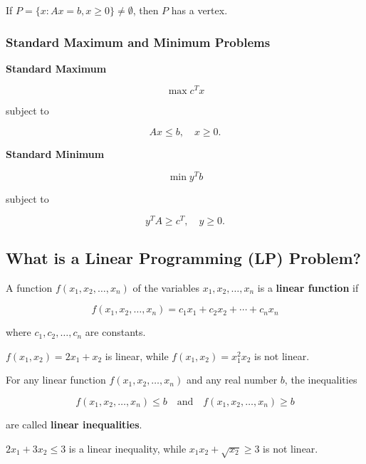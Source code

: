 \begin{Coro}
If $P=\{x:Ax=b, x\ge 0\}\neq \emptyset$, then $P$ has a vertex.
\end{Coro}


\subsubsection*{Standard Maximum and Minimum Problems}

\textbf{Standard Maximum}

\[
\max c^T x
\]

subject to

\[
Ax \le b,
\quad
x \ge 0.
\]

\textbf{Standard Minimum}

\[
\min y^T b
\]

subject to

\[
y^T A \ge c^T,
\quad
y \ge 0.
\]


\subsection{What is a Linear Programming (LP) Problem?}

\begin{Def}
A function $f(x_1,x_2,\ldots,x_n)$ of the variables 
$x_1,x_2,\ldots,x_n$ is a \textbf{linear function} if

\[
f(x_1,x_2,\ldots,x_n)=c_1x_1+c_2x_2+\cdots+c_nx_n
\]

where $c_1,c_2,\ldots,c_n$ are constants.
\end{Def}

\begin{Ejem}
$f(x_1,x_2)=2x_1+x_2$ is linear, while 
$f(x_1,x_2)=x_1^2x_2$ is not linear.
\end{Ejem}

\begin{Def}
For any linear function $f(x_1,x_2,\ldots,x_n)$ and any real number $b$,
the inequalities

\[
f(x_1,x_2,\ldots,x_n)\le b
\quad \text{and} \quad
f(x_1,x_2,\ldots,x_n)\ge b
\]

are called \textbf{linear inequalities}.
\end{Def}

\begin{Ejem}
$2x_1+3x_2\le 3$ is a linear inequality, while 
$x_1x_2+\sqrt{x_2}\ge 3$ is not linear.
\end{Ejem}


